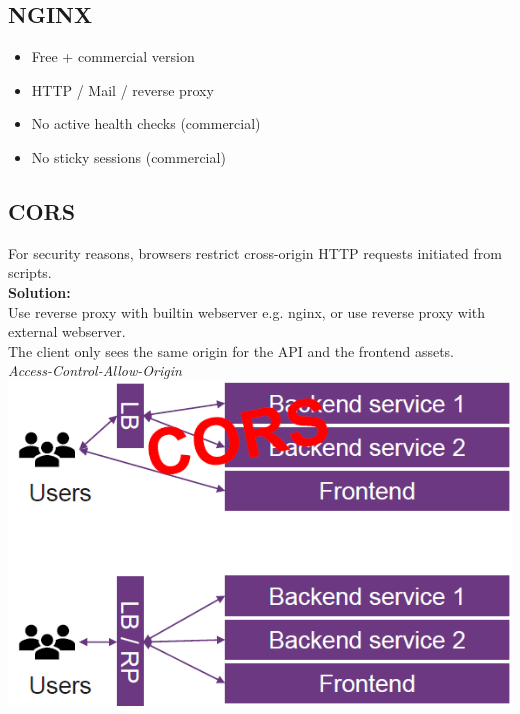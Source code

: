 \subsection{NGINX}
\begin{itemize}
    \item Free + commercial version
    \item HTTP / Mail / reverse proxy
    \item No active health checks (commercial)
    \item No sticky sessions (commercial)
\end{itemize}

\subsection{CORS}
For security reasons, browsers restrict cross-origin HTTP requests initiated from scripts.\\
\textbf{Solution:}\\
Use reverse proxy with builtin webserver e.g. nginx, or use reverse proxy with external webserver.\\
The client only sees the same origin for the API and the frontend assets.\\
\textit{Access-Control-Allow-Origin}
\includegraphics[width=0.6\linewidth]{../img/reverse_proxy.png}